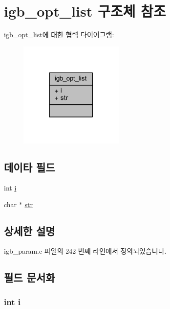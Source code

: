 \hypertarget{structigb__opt__list}{}\section{igb\+\_\+opt\+\_\+list 구조체 참조}
\label{structigb__opt__list}


igb\+\_\+opt\+\_\+list에 대한 협력 다이어그램\+:
\nopagebreak
\begin{figure}[H]
\begin{center}
\leavevmode
\includegraphics[width=146pt]{structigb__opt__list__coll__graph}
\end{center}
\end{figure}
\subsection*{데이타 필드}
\begin{DoxyCompactItemize}
\item 
int \hyperlink{structigb__opt__list_acb559820d9ca11295b4500f179ef6392}{i}
\item 
char $\ast$ \hyperlink{structigb__opt__list_ab50d783982593ef993ea0b68f7ad8b80}{str}
\end{DoxyCompactItemize}


\subsection{상세한 설명}


igb\+\_\+param.\+c 파일의 242 번째 라인에서 정의되었습니다.



\subsection{필드 문서화}
\subsubsection[{\texorpdfstring{i}{i}}]{\setlength{\rightskip}{0pt plus 5cm}int i}\hypertarget{structigb__opt__list_acb559820d9ca11295b4500f179ef6392}{}\label{structigb__opt__list_acb559820d9ca11295b4500f179ef6392}


